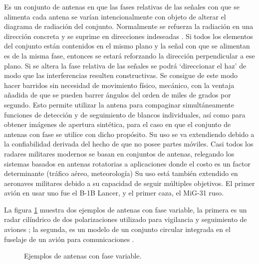 Es un conjunto de antenas en que las fases relativas de las señales con que se alimenta cada antena se varían intencionalmente
con objeto de alterar el diagrama de radiación del conjunto. Normalmente se refuerza la radiación en una dirección concreta y
se suprime en direcciones indeseadas \cite{Standard1996}. Si todos los elementos del conjunto están contenidos en el mismo plano
y la señal con que se alimentan es de la misma fase, entonces se estará reforzando la dirección perpendicular a ese plano. Si
se altera la fase relativa de las señales se podrá \enquote*{direccionar el haz} de modo que las interferencias resulten
constructivas. Se consigue de este modo hacer barridos sin necesidad de movimiento físico, mecánico, con la ventaja añadida de
que se pueden barrer ángulos del orden de miles de grados por segundo. Esto permite utilizar la antena para compaginar
simultáneamente funciones de detección y de seguimiento de blancos individuales, así como para obtener imágenes de apertura
sintética, para el caso en que el conjunto de antenas con fase se utilice con dicho propósito. Su uso se va extendiendo debido a
la confiabilidad derivada del hecho de que no posee partes móviles. Casi todos los radares militares modernos se basan en
conjuntos de antenas, relegando los sistemas basados en antenas rotatorias a aplicaciones donde el costo es un factor
determinante (tráfico aéreo, meteorología) Su uso está también extendido en aeronaves militares debido a su capacidad de
seguir múltiples objetivos. El primer avión en usar uno fue el B-1B Lancer, y el primer caza, el MiG-31 ruso.

La figura \ref{fig:phasedArrayExamples} muestra dos ejemplos de antenas con fase variable, la primera es un radar cilíndrico de
dos polarizaciones utilizado para vigilancia y seguimiento de aviones \cite{Stailey2016}; la segunda, es un modelo de un conjunto
circular integrada en el fuselaje de un avión para comunicaciones \cite{Schippers2008}.
\begin{figure}[H]
	\centering
	\caption{Ejemplos de antenas con fase variable.}
	\label{fig:phasedArrayExamples}
\end{figure}


